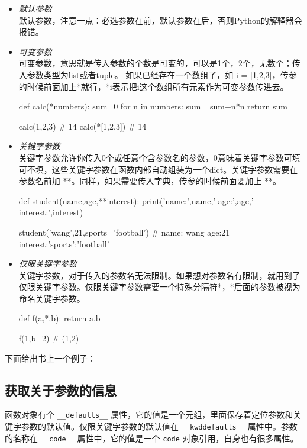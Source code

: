 \begin{itemize}
    \item \textit{默认参数} \\
    默认参数，注意一点：必选参数在前，默认参数在后，否则Python的解释器会报错。
    \item \textit{可变参数} \\
    可变参数，意思就是传入参数的个数是可变的，可以是1个，2个，无数个；传入参数类型为list或者tuple。
    如果已经存在一个数组了，如 i = [1,2,3]，传参的时候前面加上*就行，*i表示把i这个数组所有元素作为可变参数传进去。
\begin{python}
def calc(*numbers):
    sum=0
    for n in numbers:
        sum= sum+n*n
    return sum

calc(1,2,3)  # 14
calc(*[1,2,3]) # 14
\end{python}
    \item \textit{关键字参数} \\
    关键字参数允许你传入0个或任意个含参数名的参数，0意味着关键字参数可填可不填，这些关键字参数在函数内部自动组装为一个dict。关键字参数需要在参数名前加 **。同样，如果需要传入字典，传参的时候前面要加上 **。

\begin{python}
def student(name,age,**interest):
    print('name:',name,' age:',age,' interest:',interest)

student('wang',21,sports='football')
# name: wang age:21 interest:{'sports':'football'}
\end{python}

    \item \textit{仅限关键字参数} \\
    关键字参数，对于传入的参数名无法限制。如果想对参数名有限制，就用到了仅限关键字参数。仅限关键字参数需要一个特殊分隔符*，*后面的参数被视为命名关键字参数。
\begin{python}
def f(a,*,b):
    return a,b

f(1,b=2)    # (1,2)
\end{python}

\end{itemize}

下面给出书上一个例子：



\subsection{获取关于参数的信息}

函数对象有个 \texttt{\_\_defaults\_\_} 属性，它的值是一个元组，里面保存着定位参数和关键字参数的默认值。仅限关键字参数的默认值在 \texttt{\_\_kwddefaults\_\_} 属性中。参数的名称在 \texttt{\_\_code\_\_} 属性中，它的值是一个 \texttt{code} 对象引用，自身也有很多属性。

